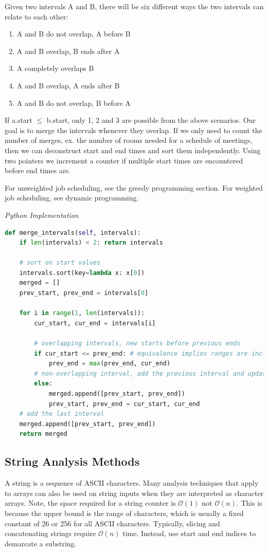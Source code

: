 \documentclass{article}
\newcommand{\bigO}{\mathcal{O}}
\begin{document}
    Given two intervals A and B, there will be six different ways the two intervals can relate to each other:
    \begin{enumerate}
        \item A and B do not overlap, A before B
        \item A and B overlap, B ends after A
        \item A completely overlaps B
        \item A and B overlap, A ends after B
        \item  A and B do not overlap, B before A
    \end{enumerate}
    If a.start $\leq$ b.start, only 1, 2 and 3 are possible from the above scenarios.  Our goal is to merge the intervals whenever they overlap. If we only need to count the number of merges, ex. the number of rooms needed for a schedule of meetings, then we can deconstruct start and end times and sort them independently. Using two pointers we increment a counter if multiple start times are encountered before end times are.
    
    For unweighted job scheduling, see the greedy programming section. For weighted job scheduling, see dynamic programming. 
    
\vspace{8pt} \emph{Python Implementation}
\begin{lstlisting}[language=Python]
def merge_intervals(self, intervals):
    if len(intervals) < 2: return intervals

    # sort on start values
    intervals.sort(key=lambda x: x[0])
    merged = []
    prev_start, prev_end = intervals[0]

    for i in range(1, len(intervals)):
        cur_start, cur_end = intervals[i]
        
        # overlapping intervals, new starts before previous ends
        if cur_start <= prev_end: # equivalence implies ranges are inclusive
            prev_end = max(prev_end, cur_end)
        # non-overlapping interval, add the previous interval and update
        else:  
            merged.append([prev_start, prev_end])
            prev_start, prev_end = cur_start, cur_end
    # add the last interval
    merged.append([prev_start, prev_end]) 
    return merged
\end{lstlisting}
    
    
    \subsection{String Analysis Methods}
    A string is a sequence of ASCII characters. Many analysis techniques that apply to arrays can also be used on string inputs when they are interpreted as character arrays. Note, the space required for a string counter is $\bigO(1)$ not $\bigO(n)$. This is because the upper bound is the range of characters, which is usually a fixed constant of 26 or 256 for all ASCII characters. Typically, slicing and concatenating strings require $\bigO(n)$ time. Instead, use start and end indices to demarcate a substring.
    
\end{document}
